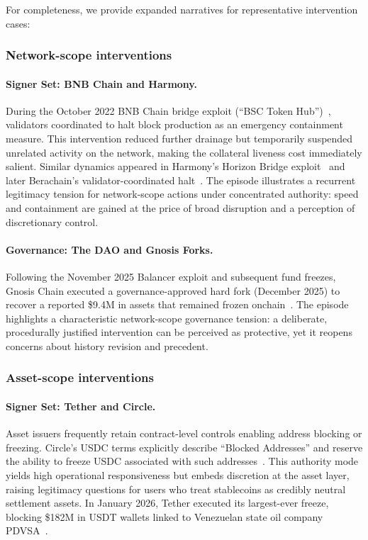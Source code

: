 \documentclass[12pt]{article}
\begin{document}
For completeness, we provide expanded narratives for representative intervention cases:

\subsubsection{Network-scope interventions}
\label{sec:incidents-network}

\paragraph{Signer Set: BNB Chain and Harmony.}
During the October 2022 BNB Chain bridge exploit (``BSC Token Hub'')~\cite{BNBChainResponse, MerkleScienceBNB2022}, validators coordinated to halt block production as an emergency containment measure. This intervention reduced further drainage but temporarily suspended unrelated activity on the network, making the collateral liveness cost immediately salient. Similar dynamics appeared in Harmony's Horizon Bridge exploit~\cite{Harmony2022Exploit} and later Berachain's validator-coordinated halt~\cite{Berachain2025PostMortem}. The episode illustrates a recurrent legitimacy tension for network-scope actions under concentrated authority: speed and containment are gained at the price of broad disruption and a perception of discretionary control.

\paragraph{Governance: The DAO and Gnosis Forks.}
Following the November 2025 Balancer exploit and subsequent fund freezes, Gnosis Chain executed a governance-approved hard fork (December 2025) to recover a reported \$9.4M in assets that remained frozen onchain~\cite{Gnosis2025HardFork,Gnosis2025BalancerHack}. The episode highlights a characteristic network-scope governance tension: a deliberate, procedurally justified intervention can be perceived as protective, yet it reopens concerns about history revision and precedent.

\subsubsection{Asset-scope interventions}
\label{sec:incidents-asset}

\paragraph{Signer Set: Tether and Circle.}
Asset issuers frequently retain contract-level controls enabling address blocking or freezing. Circle's USDC terms explicitly describe ``Blocked Addresses'' and reserve the ability to freeze USDC associated with such addresses~\cite{CircleUSDCTerms2025}. This authority mode yields high operational responsiveness but embeds discretion at the asset layer, raising legitimacy questions for users who treat stablecoins as credibly neutral settlement assets. In January 2026, Tether executed its largest-ever freeze, blocking \$182M in USDT wallets linked to Venezuelan state oil company PDVSA~\cite{TetherVenezuela2026}.
\end{document}
